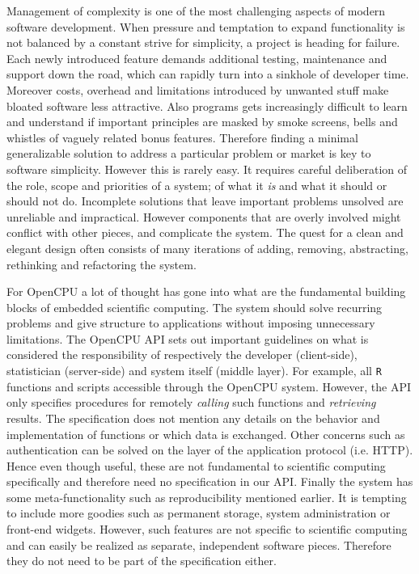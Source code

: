 \documentclass{article}
\newcommand{\R}{\texttt{R}\xspace}
\begin{document}
\noindent Management of complexity is one of the most challenging aspects of modern software development. When pressure and temptation to expand functionality is not balanced by a constant strive for simplicity, a project is heading for failure. Each newly introduced feature demands additional testing, maintenance and support down the road, which can rapidly turn into a sinkhole of developer time. Moreover costs, overhead and limitations introduced by unwanted stuff make bloated software less attractive. Also programs gets increasingly difficult to learn and understand if important principles are masked by smoke screens, bells and whistles of vaguely related bonus features. Therefore finding a minimal generalizable solution to address a particular problem or market is key to software simplicity. However this is rarely easy. It requires careful deliberation of the role, scope and priorities of a system; of what it \emph{is} and what it should or should not do. Incomplete solutions that leave important problems unsolved are unreliable and impractical. However components that are overly involved might conflict with other pieces, and complicate the system. The quest for a clean and elegant design often consists of many iterations of adding, removing, abstracting, rethinking and refactoring the system.

For OpenCPU a lot of thought has gone into what are the fundamental building blocks of embedded scientific computing. The system should solve recurring problems and give structure to applications without imposing unnecessary limitations. The OpenCPU API sets out important guidelines on what is considered the responsibility of respectively the developer (client-side), statistician (server-side) and system itself (middle layer). For example, all \R functions and scripts accessible through the OpenCPU system. However, the API only specifies  procedures for remotely \emph{calling} such functions and \emph{retrieving} results. The specification does not mention any details on the behavior and implementation of functions or which data is exchanged. Other concerns such as authentication can be solved on the layer of the application protocol (i.e. HTTP). Hence even though useful, these are not fundamental to scientific computing specifically and therefore need no specification in our API. Finally the system has some meta-functionality such as reproducibility mentioned earlier. It is tempting to include more goodies such as permanent storage, system administration or front-end widgets. However, such features are not specific to scientific computing and can easily be realized as separate, independent software pieces. Therefore they do not need to be part of the specification either. 
\end{document}
